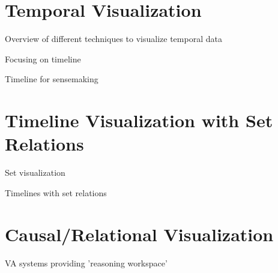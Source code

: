 \section{Temporal Visualization}
Overview of different techniques to visualize temporal data

Focusing on timeline

Timeline for sensemaking

\section{Timeline Visualization with Set Relations}
Set visualization

Timelines with set relations

\section{Causal/Relational Visualization}
VA systems providing 'reasoning workspace'